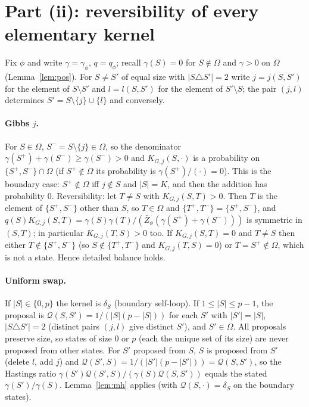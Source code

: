 \documentclass[11pt]{article}
\theoremstyle{remark}
\newcommand{\Om}{\Omega}
\newcommand{\Zb}{\bar Z}
\begin{document}
\section{Part (ii): reversibility of every elementary kernel}

Fix $\phi$ and write $\gamma=\gamma_\phi$, $q=q_\phi$; recall $\gamma(S)=0$ for $S\notin\Om$ and $\gamma>0$ on $\Om$ (Lemma~\ref{lem:pos}). For $S\ne S'$ of equal size with $|S\triangle S'|=2$ write $j=j(S,S')$ for the element of $S\setminus S'$ and $l=l(S,S')$ for the element of $S'\setminus S$; the pair $(j,l)$ determines $S'=S\setminus\{j\}\cup\{l\}$ and conversely.

\paragraph{Gibbs $j$.} For $S\in\Om$, $S^-=S\setminus\{j\}\in\Om$, so the denominator $\gamma(S^+)+\gamma(S^-)\ge\gamma(S^-)>0$ and $K_{G,j}(S,\cdot)$ is a probability on $\{S^+,S^-\}\cap\Om$ (if $S^+\notin\Om$ its probability is $\gamma(S^+)/(\cdot)=0$). This is the boundary case: $S^+\notin\Om$ iff $j\notin S$ and $|S|=K$, and then the addition has probability $0$. Reversibility: let $T\ne S$ with $K_{G,j}(S,T)>0$. Then $T$ is the element of $\{S^+,S^-\}$ other than $S$, so $T\in\Om$ and $\{T^+,T^-\}=\{S^+,S^-\}$, and
$q(S)K_{G,j}(S,T)=\gamma(S)\gamma(T)/(\Zb_\phi(\gamma(S^+)+\gamma(S^-)))$ is symmetric in $(S,T)$; in particular $K_{G,j}(T,S)>0$ too. If $K_{G,j}(S,T)=0$ and $T\neq S$ then either $T\notin\{S^+,S^-\}$ (so $S\notin\{T^+,T^-\}$ and $K_{G,j}(T,S)=0$) or $T=S^+\notin\Om$, which is not a state. Hence detailed balance holds.

\paragraph{Uniform swap.} If $|S|\in\{0,p\}$ the kernel is $\delta_S$ (boundary self-loop). If $1\le|S|\le p-1$, the proposal is $\mathcal Q(S,S')=1/(|S|(p-|S|))$ for each $S'$ with $|S'|=|S|$, $|S\triangle S'|=2$ (distinct pairs $(j,l)$ give distinct $S'$), and $S'\in\Om$. All proposals preserve size, so states of size $0$ or $p$ (each the unique set of its size) are never proposed from other states. For $S'$ proposed from $S$, $S$ is proposed from $S'$ (delete $l$, add $j$) and $\mathcal Q(S',S)=1/(|S'|(p-|S'|))=\mathcal Q(S,S')$, so the Hastings ratio $\gamma(S')\mathcal Q(S',S)/(\gamma(S)\mathcal Q(S,S'))$ equals the stated $\gamma(S')/\gamma(S)$. Lemma~\ref{lem:mh} applies (with $\mathcal Q(S,\cdot)=\delta_S$ on the boundary states).
\end{document}
